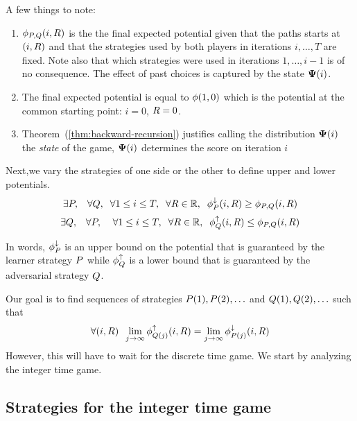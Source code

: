 \documentclass{article}[12pt]
\begin{document}
A few things to note:
\begin{enumerate}
\item $\phi_{P,Q}(i,R)$ is the the final expected potential
  given that the paths starts at $(i,R)$ and that
  the strategies used by both players in iterations $i,\ldots,T$ are fixed. Note
  also that which strategies were used in iterations $1,\ldots,i-1$ is
  of no consequence. The effect of past choices is captured by the
  state ${\bf \Psi}(i)$.
\item
  The final expected potential is equal to $\phi(1,0)$ which is the
  potential at the common starting point: $i=0$, $R=0$.
\item
  Theorem~(\ref{thm:backward-recursion}) justifies calling the
  distribution ${\bf \Psi}(i)$ the {\em state} of the game, ${\bf \Psi}(i)$
  determines the score on iteration $i$
\end{enumerate}

Next,we vary the strategies of one side or the other to define upper
and lower potentials.
\begin{equation} \label{eqn:upperPotentials}
  \exists P, \;\;\; \forall Q,\;\; \forall 1\leq i \leq
  T,\;\; \forall R \in \mathbb{R},\;\; \phi_{P}^{\downarrow}(i,R) \geq \phi_{P,Q}(i,R)
\end{equation}
\begin{equation} \label{eqn:lowerPotentials}
  \exists Q, \;\;\; \forall P, \;\; \;\; \forall 1\leq i \leq
  T,\;\; \forall R \in \mathbb{R},\;\; \phi_{Q}^{\uparrow}(i,R) \leq \phi_{P,Q}(i,R)
\end{equation}

In words, $\phi_{P}^{\downarrow}$ is an upper bound on the potential that is 
guaranteed by the learner strategy $P$ while $\phi_{Q}^{\uparrow}$
is a lower bound that is guaranteed by the adversarial
strategy $Q$.

Our goal is to find sequences of strategies $P(1),P(2),\ldots$ and
$Q(1),Q(2),\ldots$ such that
\begin{equation} \label{eqn:limitPotential}
\forall (i,R)\;\;\lim_{j \to \infty}\phi_{Q(j)}^{\uparrow}(i,R) = \lim_{j \to
  \infty} \phi_{P(j)}^{\downarrow}(i,R)
\end{equation}
However, this will have to wait for the discrete time game.
We start by analyzing the integer time game. 


\subsection{Strategies for the integer time  game} \label{sec:strat-integer}
\end{document}
